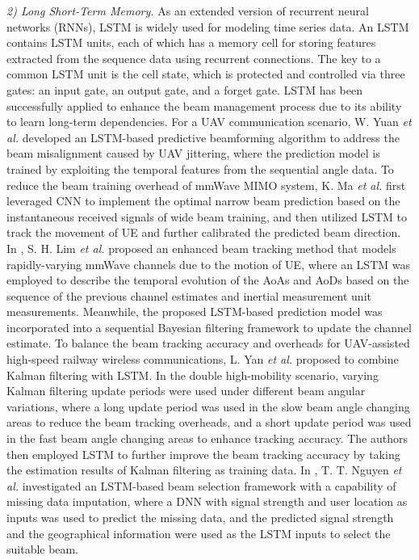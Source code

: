 \documentclass[journal,comsoc]{IEEEtran}
\begin{document}
\emph{2) Long Short-Term Memory.} As an extended version of recurrent neural networks (RNNs), LSTM is widely used for modeling time series data. An LSTM contains LSTM units, each of which has a memory cell for storing features extracted from the sequence data using recurrent connections. The key to a common LSTM unit is the cell state, which is protected and controlled via three gates: an input gate, an output gate, and a forget gate. LSTM has been successfully applied to enhance the beam management process due to its ability to learn long-term dependencies. For a UAV communication scenario, W. Yuan \emph{et al.} \cite{Learning-Predictive-Beamforming-UAV-2020} developed an LSTM-based predictive beamforming algorithm to address the beam misalignment caused by UAV jittering, where the prediction model is trained by exploiting the temporal features from the sequential angle data. To reduce the beam training overhead of mmWave MIMO system, K. Ma \emph{et al.} \cite{Deep-Learning-Calibrated-Beam-Training-2021} first leveraged CNN to implement the optimal narrow beam prediction based on the instantaneous received signals of wide beam training, and then utilized LSTM to track the movement of UE and further calibrated the predicted beam direction. In \cite{Deep-Learning-Beam-Tracking-2021}, S. H. Lim \emph{et al.} proposed an enhanced beam tracking method that models rapidly-varying mmWave channels due to the motion of UE, where an LSTM was employed to describe the temporal evolution of the AoAs and AoDs based on the sequence of the previous channel estimates and inertial measurement unit measurements. Meanwhile, the proposed LSTM-based prediction model was incorporated into a sequential Bayesian filtering framework to update the channel estimate. To balance the beam tracking accuracy and overheads for UAV-assisted high-speed railway wireless communications, L. Yan \emph{et al.} \cite{KF-LSTM-Beam-Tracking-UAV-2022} proposed to combine Kalman filtering with LSTM. In the double high-mobility scenario, varying Kalman filtering update periods were used under different beam angular variations, where a long update period was used in the slow beam angle changing areas to reduce the beam tracking overheads, and a short update period was used in the fast beam angle changing areas to enhance tracking accuracy. The authors then employed LSTM to further improve the beam tracking accuracy by taking the estimation results of Kalman filtering as training data. In \cite{A-Deep-Learning-Framework-Beam-Selection-2022}, T. T. Nguyen \emph{et al.} investigated an LSTM-based beam selection framework with a capability of missing data imputation, where a DNN with signal strength and user location as inputs was used to predict the missing data, and the predicted signal strength and the geographical information were used as the LSTM inputs to select the suitable beam.
\end{document}
